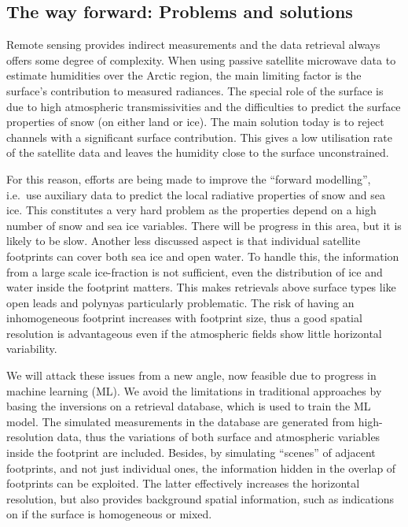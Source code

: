 \documentclass[12pt,oneside,a4paper]{article}
\begin{document}
\subsection{The way forward: Problems and solutions }

Remote sensing provides indirect measurements and the data retrieval always
offers some degree of complexity. When using passive satellite microwave data
to estimate humidities over the Arctic region, the main limiting factor is the
surface's contribution to measured radiances. The special role of the surface
is due to high atmospheric transmissivities and the difficulties to predict the
surface properties of snow (on either land or ice). The main solution today is
to reject channels with a significant surface contribution. This gives a low
utilisation rate of the satellite data and leaves the humidity close to the
surface unconstrained.

For this reason, efforts are being made to improve the ``forward modelling'',
i.e.\ use auxiliary data to predict the local radiative properties of snow and
sea ice. This constitutes a very hard problem as the properties depend on a
high number of snow and sea ice variables. There will be progress in this area,
but it is likely to be slow. Another less discussed aspect is that individual
satellite footprints can cover both sea ice and open water. To handle this, the
information from a large scale ice-fraction is not sufficient, even the
distribution of ice and water inside the footprint matters. This makes
retrievals above surface types like open leads and polynyas particularly
problematic. The risk of having an inhomogeneous footprint increases with
footprint size, thus a good spatial resolution is advantageous even if the
atmospheric fields show little horizontal variability.

We will attack these issues from a new angle, now feasible due to progress in
machine learning (ML). We avoid the limitations in traditional approaches by
basing the inversions on a retrieval database, which is used to train the ML
model. The simulated measurements in the database are generated from
high-resolution data, thus the variations of both surface and atmospheric variables
inside the footprint are included. Besides, by simulating ``scenes'' of
adjacent footprints, and not just individual ones, the information hidden in
the overlap of footprints can be exploited. The latter effectively increases the
horizontal resolution, but also provides background spatial information, such
as indications on if the surface is homogeneous or mixed.
\end{document}
